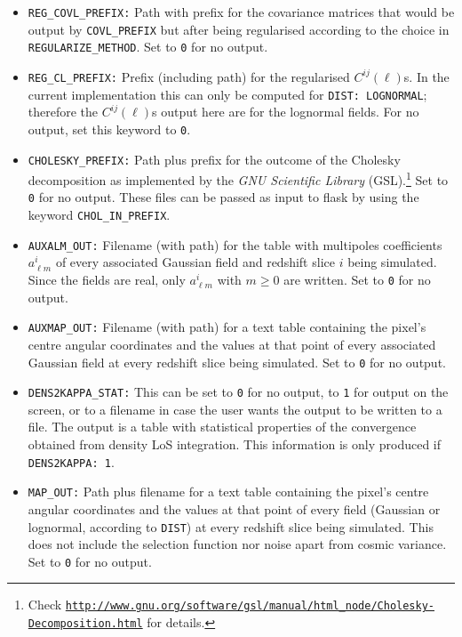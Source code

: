 \documentclass[12pt]{book} %
\begin{document}
\begin{itemize}
\item {\tt REG\_COVL\_PREFIX:} Path with prefix for the covariance matrices that would be output 
  by {\tt COVL\_PREFIX} but after being regularised according to the choice in {\tt REGULARIZE\_METHOD}.
  Set to {\tt 0} for no output.

\item {\tt REG\_CL\_PREFIX:} Prefix (including path) for the regularised $C^{ij}(\ell)$s. In the 
  current implementation this can only be computed for {\tt DIST: LOGNORMAL}; therefore the 
  $C^{ij}(\ell)$s output here are for the lognormal fields. For no output, set this keyword to {\tt 0}.

\item {\tt CHOLESKY\_PREFIX:} Path plus prefix for the outcome of the Cholesky decomposition 
  as implemented by the \emph{GNU Scientific Library} 
  (GSL).\footnote{ Check {\tt \href{ http://www.gnu.org/software/gsl/manual/html\_node/Cholesky-Decomposition.html}{http://www.gnu.org/software/gsl/manual/html\_node/Cholesky-Decomposition.html}} for details.} Set to {\tt 0} for no output. 
  These files can be passed as input to {\sc flask} by using the keyword {\tt CHOL\_IN\_PREFIX}.
  
\item {\tt AUXALM\_OUT:} Filename (with path) for the table with multipoles coefficients 
  $a^{i}_{\ell m}$ of every associated Gaussian field and redshift slice $i$ being simulated. 
  Since the fields are real, only $a^{i}_{\ell m}$ with $m\geq 0$ are written.
  Set to {\tt 0} for no output.

\item {\tt AUXMAP\_OUT:} Filename (with path) for a text table containing the pixel's centre angular 
  coordinates and the values at that point of every associated Gaussian field at every redshift slice 
  being simulated. Set to {\tt 0} for no output.

\item {\tt DENS2KAPPA\_STAT:} This can be set to {\tt 0} for no output, to {\tt 1} for output 
  on the screen, or to a filename in case the user wants the output to be written to a file. 
  The output is a table with statistical properties of the convergence obtained from density 
  LoS integration. This information is only produced if {\tt DENS2KAPPA: 1}.

\item {\tt MAP\_OUT:} Path plus filename for a text table containing the pixel's centre angular 
  coordinates and the values at that point of every field (Gaussian or lognormal, according to 
  {\tt DIST}) at every redshift slice being simulated. This does not include the selection function 
  nor noise apart from cosmic variance. Set to {\tt 0} for no output. 


\end{itemize}
\end{document}
